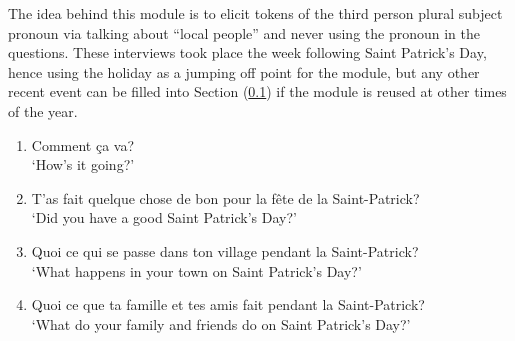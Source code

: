 The idea behind this module is to elicit tokens of the third person plural subject pronoun via talking about ``local people'' and never using the pronoun in the questions. These interviews took place the week following Saint Patrick's Day, hence using the holiday as a jumping off point for the module, but any other recent event can be filled into Section (\ref{sec:warmup}) if the module is reused at other times of the year.

\begin{enumerate}
    \subsection{Warmup Questions}
        \label{sec:warmup}
        \item Comment ça va?\\
              `How's it going?'
        \item T'as fait quelque chose de bon pour la fête de la Saint-Patrick?\\
              `Did you have a good Saint Patrick's Day?'
        \item Quoi ce qui se passe dans ton village pendant la Saint-Patrick?\\
              `What happens in your town on Saint Patrick's Day?'
        \item Quoi ce que ta famille et tes amis fait pendant la Saint-Patrick?\\
              `What do your family and friends do on Saint Patrick's Day?'

\end{enumerate}
